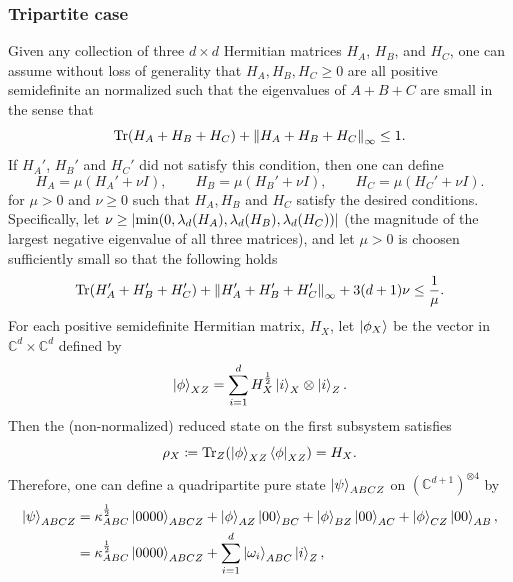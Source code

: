 \documentclass[notitlepage]{article}
\begin{document}
\subsubsection{Tripartite case}

Given any collection of three $d\times d$ Hermitian matrices $H_A$, $H_B$, and $H_C$, one can assume without loss of generality that $H_{A}, H_{B}, H_{C} \geq 0$ are all positive semidefinite an normalized such that the eigenvalues of $A+B+C$ are small in the sense that
\begin{equation}
    \operatorname{Tr}(H_A + H_B + H_C) + \left\lVert H_A + H_B + H_C\right\rVert_{\infty} \leq 1.
\end{equation}
If $H_A'$, $H_B'$ and $H_C'$ did not satisfy this condition, then one can define
\begin{equation}
    H_A = \mu \left(H_A' + \nu I\right), \qquad
    H_B = \mu \left(H_B' + \nu I\right), \qquad
    H_C = \mu \left(H_C' + \nu I\right).
\end{equation}
for $\mu > 0$ and $\nu \geq 0$ such that $H_A, H_B$ and $H_C$ satisfy the desired conditions.
Specifically, let $\nu \geq \left|\min(0, \lambda_d(H_A), \lambda_d(H_B), \lambda_d(H_C))\right|$ (the magnitude of the largest negative eigenvalue of all three matrices), and let $\mu > 0$ is choosen sufficiently small so that the following holds
\begin{equation}
    \operatorname{Tr}(H_A' + H_B' + H_C') + \left\lVert H_A' + H_B' + H_C'\right\rVert_{\infty} + 3 (d+1) \nu \leq \frac{1}{\mu}.
\end{equation}
For each positive semidefinite Hermitian matrix, $H_X$, let $\ket{\phi_X}$ be the vector in $\mathbb C^d \times \mathbb C^d$ defined by
\begin{equation}
    \ket{\phi}_{XZ} = \sum_{i=1}^{d} H_X^{\frac{1}{2}} \ket{i}_X \otimes \ket{i}_Z.
\end{equation}
Then the (non-normalized) reduced state on the first subsystem satisfies
\begin{equation}
    \rho_X \coloneqq \operatorname{Tr}_Z(\ket{\phi}_{XZ}\bra{\phi}_{XZ}) = H_X.
\end{equation}
Therefore, one can define a quadripartite pure state $\ket{\psi}_{ABCZ}$ on $(\mathbb C^{d+1})^{\otimes 4}$ by
\begin{align}
    \ket{\psi}_{ABCZ} 
    &=\kappa_{ABC}^{\frac{1}{2}} \ket{0000}_{ABCZ} + \ket{\phi}_{AZ} \ket{00}_{BC} + \ket{\phi}_{BZ} \ket{00}_{AC}  + \ket{\phi}_{CZ} \ket{00}_{AB},\\
    &=\kappa_{ABC}^{\frac{1}{2}} \ket{0000}_{ABCZ} + \sum_{i=1}^{d} \ket{\omega_i}_{ABC}\ket{i}_{Z},
\end{align}
\end{document}

